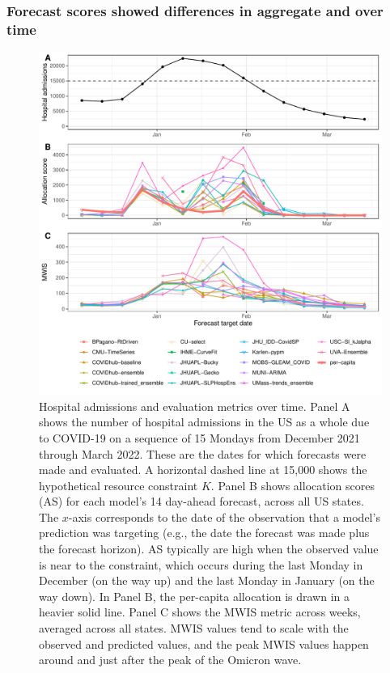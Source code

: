 \documentclass{article}\usepackage[]{graphicx}\usepackage[]{xcolor}
\makeatletter
\def\maxwidth{ %
  \ifdim\Gin@nat@width>\linewidth
    \linewidth
  \else
    \Gin@nat@width
  \fi
}
\newenvironment{knitrout}{}{} %
\makeatother
\begin{document}
\subsubsection{Forecast scores showed differences in aggregate and over time}



\begin{knitrout}
\color{fgcolor}\begin{figure}
\includegraphics[width=\maxwidth]{figure/metrics-over-time-1} \caption[Hospital admissions and evaluation metrics over time]{Hospital admissions and evaluation metrics over time. Panel A shows the number of hospital admissions in the US as a whole due to COVID-19 on a sequence of 15 Mondays from December 2021 through March 2022. These are the dates for which forecasts were made and evaluated. A horizontal dashed line at 15,000 shows the hypothetical resource constraint $K$. Panel B shows allocation scores (AS) for each model's 14 day-ahead forecast, across all US states. The $x$-axis corresponds to the date of the observation that a model's prediction was targeting (e.g., the date the forecast was made plus the forecast horizon). AS typically are high when the observed value is near to the constraint, which occurs during the last Monday in December (on the way up) and the last Monday in January (on the way down). In Panel B, the per-capita allocation is drawn in a heavier solid line. Panel C shows the MWIS metric across weeks, averaged across all states. MWIS values tend to scale with the observed and predicted values, and the peak MWIS values happen around and just after the peak of the Omicron wave.}\label{fig:metrics-over-time}
\end{figure}

\end{knitrout}
\end{document}
